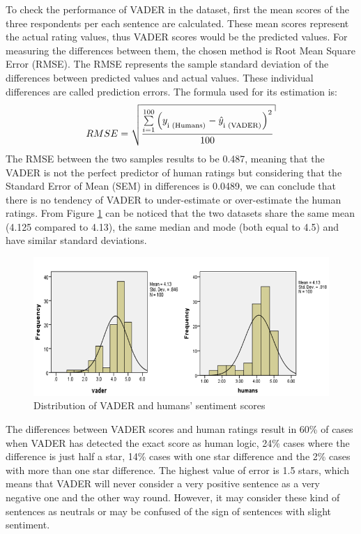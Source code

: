 To check the performance of VADER in the dataset, first the mean scores of the three respondents per each sentence are calculated. These mean scores represent the actual rating values, thus VADER scores would  be the predicted values.  For measuring the differences between them, the chosen method is Root Mean Square Error (RMSE). The RMSE represents the sample standard deviation of the differences between predicted values and actual values. These individual differences are called prediction errors. The formula used for its estimation is:
\begin{equation}
 RMSE = \sqrt {{\frac{{\sum\limits_{{i = 1}}^{100} {{{\left( {{y_\textsubscript{i (Humans)}} - {{\hat{y}}_\textsubscript{i (VADER)}}} \right)}^2}} }}{{100}}}}
 \label{RMSE}
\end{equation}
The RMSE between the two samples results to be 0.487, meaning that the VADER is not the perfect predictor of human ratings but considering that the Standard Error of Mean (SEM) in differences is 0.0489, we can conclude that there is no tendency of VADER to under-estimate or over-estimate the human ratings. From Figure \ref{fig:distribution} can be noticed that the two datasets share the same mean (4.125 compared to 4.13), the same median and mode (both equal to 4.5) and have similar standard deviations. 
\begin{figure}[h!]
	\centering
	\includegraphics[height=0.33\textheight]{graphs_vader_humans}
	\caption{Distribution of VADER and humans' sentiment scores}
	\label{fig:distribution}
\end{figure}

The differences between VADER scores and human ratings result in 60\% of cases when VADER has detected the exact score as human logic, 24\% cases where the difference is just half a star, 14\% cases with one star difference and the 2\% cases with more than one star difference. The highest value of error is 1.5 stars, which means that VADER will never consider a very positive sentence as a very negative one and the other way round. However, it may consider these kind of sentences as neutrals or may be confused of the sign of sentences with slight sentiment.

